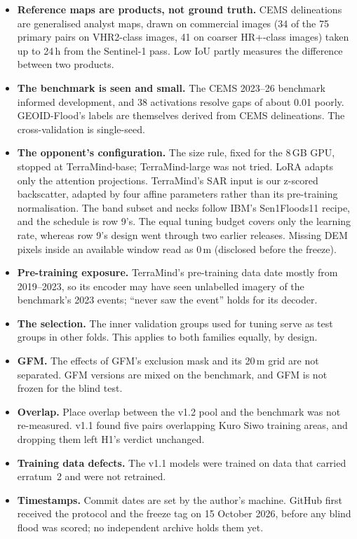 \documentclass[10pt,twocolumn,a4paper]{article}
\begin{document}
\begin{itemize}
  \item \textbf{Reference maps are products, not ground truth.} CEMS delineations are generalised analyst maps, drawn
    on commercial images (34 of the 75 primary pairs on VHR2-class images, 41 on coarser HR+-class images) taken up
    to 24\,h from the Sentinel-1 pass. Low IoU partly measures the difference between two products.
  \item \textbf{The benchmark is seen and small.} The CEMS 2023--26 benchmark informed development, and 38
    activations resolve gaps of about 0.01 poorly. GEOID-Flood's labels are themselves derived from CEMS
    delineations. The cross-validation is single-seed.
  \item \textbf{The opponent's configuration.} The size rule, fixed for the 8\,GB GPU, stopped at TerraMind-base;
    TerraMind-large was not tried. LoRA adapts only the attention projections. TerraMind's SAR input is our z-scored
    backscatter, adapted by four affine parameters rather than its pre-training normalisation. The band subset and
    necks follow IBM's Sen1Floods11 recipe, and the schedule is row 9's. The equal tuning budget covers only the
    learning rate, whereas row 9's design went through two earlier releases. Missing DEM pixels inside an available
    window read as 0\,m (disclosed before the freeze).
  \item \textbf{Pre-training exposure.} TerraMind's pre-training data date mostly from 2019--2023, so its encoder may
    have seen unlabelled imagery of the benchmark's 2023 events; ``never saw the event'' holds for its decoder.
  \item \textbf{The selection.} The inner validation groups used for tuning serve as test groups in other folds. This
    applies to both families equally, by design.
  \item \textbf{GFM.} The effects of GFM's exclusion mask and its 20\,m grid are not separated. GFM versions are mixed
    on the benchmark, and GFM is not frozen for the blind test.
  \item \textbf{Overlap.} Place overlap between the v1.2 pool and the benchmark was not re-measured. v1.1 found five
    pairs overlapping Kuro Siwo training areas, and dropping them left H1's verdict unchanged.
  \item \textbf{Training data defects.} The v1.1 models were trained on data that carried erratum~2 and were not
    retrained.
  \item \textbf{Timestamps.} Commit dates are set by the author's machine. GitHub first received the protocol and the
    freeze tag on 15 October 2026, before any blind flood was scored; no independent archive holds them yet.
\end{itemize}
\end{document}
